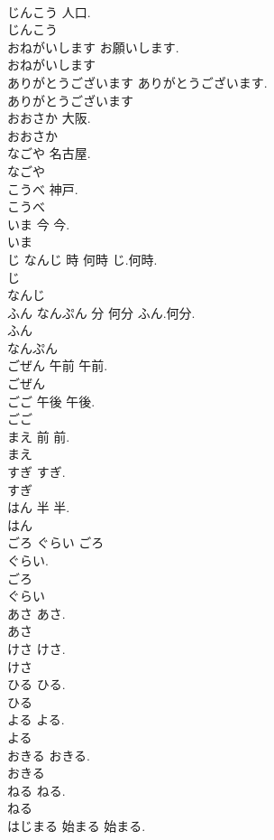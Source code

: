 \documentclass[8pt]{extreport}
\begin{document}
\begin{CJK}{UTF8}{min}
\\	じんこう		人口.	
\\	じんこう
\\	おねがいします		お願いします.	
\\	おねがいします
\\	ありがとうございます		ありがとうございます.	
\\	ありがとうございます
\\	おおさか		大阪.	
\\	おおさか
\\	なごや		名古屋.	
\\	なごや
\\	こうべ		神戸.	
\\	こうべ
\\	いま	今	今.	
\\	いま
\\	じ なんじ	時 何時	じ.何時.	
\\	じ
\\	なんじ
\\	ふん なんぷん	分 何分	ふん.何分.	
\\	ふん
\\	なんぷん
\\	ごぜん	午前	午前.	
\\	ごぜん
\\	ごご	午後	午後.	
\\	ごご
\\	まえ	前	前.	
\\	まえ
\\	すぎ		すぎ.	
\\	すぎ
\\	はん	半	半.	
\\	はん
\\	ごろ ぐらい		ごろ 
\\	ぐらい.	
\\	ごろ
\\	ぐらい
\\	あさ		あさ.	
\\	あさ
\\	けさ		けさ.	
\\	けさ
\\	ひる		ひる.	
\\	ひる
\\	よる		よる.	
\\	よる
\\	おきる		おきる.	
\\	おきる
\\	ねる		ねる.	
\\	ねる
\\	はじまる	始まる	始まる.	

\end{CJK}
\end{document}
